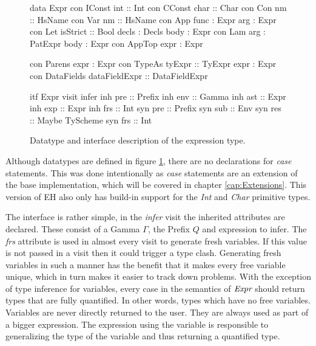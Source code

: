 \begin{figure}[H]
\begin{minipage}[t]{0.4\linewidth}
\begin{code}
data Expr
  con IConst
    int            :: Int
  con CConst       
    char           :: Char
  con Con          
    nm             :: HsName
  con Var          
    nm             :: HsName
  con App          
    func           :  Expr
    arg            :  Expr
  con Let          
    isStrict       :: Bool
    decls          :  Decls
    body           :  Expr
  con Lam          
    arg            :  PatExpr
    body           :  Expr
  con AppTop       
    expr           :  Expr
\end{code}
\end{minipage}
\begin{minipage}[t]{0.6\linewidth}
\begin{code}
  con Parens
    expr           :  Expr
  con TypeAs       
    tyExpr         :: TyExpr
    expr           :  Expr
  con DataFields   
    dataFieldExpr  :: DataFieldExpr

itf Expr
  visit infer
    inh pre  :: Prefix
    inh env  :: Gamma
    inh ast  :: Expr
    inh exp  :: Expr
    inh frs  :: Int
    syn pre  :: Prefix
    syn sub  :: Env
    syn res  :: Maybe TyScheme
    syn frs  :: Int
\end{code}
\end{minipage}
\caption{Datatype and interface description of the expression type.}
\label{abs:fig:expr}
\end{figure}

Although datatypes are defined in figure \ref{abs:fig:expr}, there are no declarations for \emph{case} statements. This was done intentionally as \emph{case} statements are an extension of the base implementation, which will be covered in chapter \ref{cap:Extensions}. This version of EH also only has build-in support for the \emph{Int} and \emph{Char} primitive types.

The interface is rather simple, in the \emph{infer} visit the inherited attributes are declared. These consist of a Gamma $\Gamma$, the Prefix $Q$ and expression to infer. The \emph{frs} attribute is used in almost every visit to generate fresh variables. If this value is not passed in a visit then it could trigger a type clash. Generating fresh variables in such a manner has the benefit that it makes every free variable unique, which in turn makes it easier to track down problems. With the exception of type inference for variables, every case in the semantics of $\emph{Expr}$ should return types that are fully quantified. In other words, types which have no free variables. Variables are never directly returned to the user. They are always used as part of a bigger expression. The expression using the variable is responsible to generalizing the type of the variable and thus returning a quantified type.

